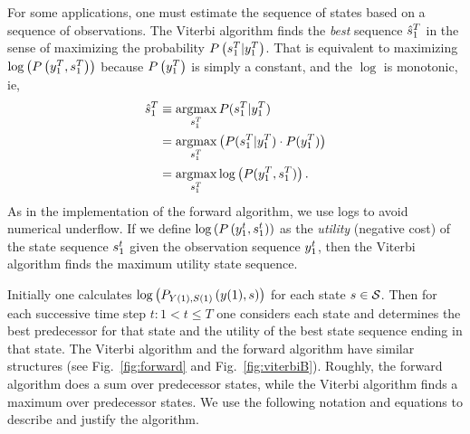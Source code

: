 For some applications, one must estimate the sequence of states based
on a sequence of observations.  The Viterbi algorithm %
%
finds the \emph{best} sequence $\hat s_{1}^{T}$ in the sense of
maximizing the probability $P\left( s_{1}^{T}|y_{1}^{T}
\right)$.  That is equivalent to maximizing $\log \left( P\left(
    y_{1}^{T},s_{1}^{T} \right) \right)$ because $P \left(
  y_{1}^{T} \right)$ is simply a constant, and the $\log$ is
monotonic, ie,
\begin{align*}
  \hat s_{1}^{T} &\equiv \operatorname*{argmax}_{s_{1}^{T}}
  P(s_{1}^{T}|y_{1}^{T})\\
  &= \operatorname*{argmax}_{s_{1}^{T}} \left( P(s_{1}^{T}|y_{1}^{T}) \cdot
    P(y_{1}^{T}) \right)\\
  &= \operatorname*{argmax}_{s_{1}^{T}} \log \left( P(y_{1}^{T},s_{1}^{T})
  \right).
\end{align*}
As in the implementation of the forward algorithm, we use logs to
avoid numerical underflow.  If we define $\log \left( P\left(
    y_{1}^{t}, s_{1}^{t} \right) \right)$ as the
\emph{utility} (negative cost) of the state sequence $s_{1}^{t}$
given the observation sequence $y_{1}^{t}$, then the Viterbi
algorithm finds the maximum utility state sequence.

Initially one calculates
$\log\left(P_{{Y}{(1)},{S}{(1)}} \left({y}{(1)}, s \right) \right)$
for each state $s \in \states$.  Then for each successive time step
$t: 1 < t \leq T$ one considers each state and determines the best
predecessor for that state and the utility of the best state sequence
ending in that state.  The Viterbi algorithm and the forward algorithm
have similar structures (see Fig.~\ref{fig:forward} and
Fig.~\ref{fig:viterbiB}).  Roughly, the forward algorithm does a sum
over predecessor states, while the Viterbi algorithm finds a maximum
over predecessor states. We use the following notation and equations
to describe and justify the algorithm.

